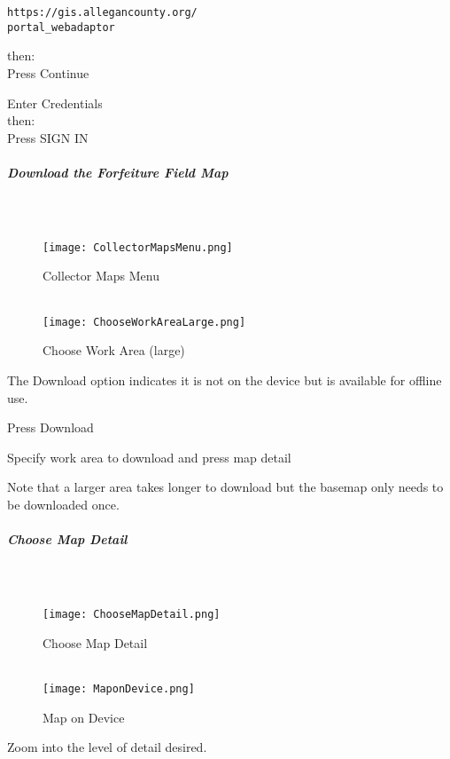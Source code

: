 \documentclass[class=article , crop=false, titlepage, twoside, multi={itemize, figure, verbatim}, float=false]{standalone}
\begin{document}
\begin{verbatim}
https://gis.allegancounty.org/
portal_webadaptor

\end{verbatim}

then:\\

Press \Large Continue

\vspace{3in}
Enter Credentials\\

then:\\

Press \Large SIGN IN
\clearpage
\subparagraph{Download the Forfeiture Field Map}

\subparagraph*{\\}
\begin{wrapfigure}{r}{0.5\textwidth}
\centering
\texttt{[image: CollectorMapsMenu.png]}
\caption{Collector Maps Menu}
\vspace{.25in}
\HRule \\[.4cm] %
\vspace{.25in}
\texttt{[image: ChooseWorkAreaLarge.png]}
\caption{Choose Work Area (large)}
\end{wrapfigure}
The Download option indicates it is not on the device but is available for offline use.
\vspace{.5in}

\noindent Press \Large Download\\
\vspace{3in}

\noindent Specify work area to download and press \Large map detail\\
\vspace{.5in}

\noindent \footnotesize Note that a larger area takes longer to download but the basemap only needs to be downloaded once.
\clearpage
\subparagraph{Choose Map Detail}

\subparagraph*{\\}
\begin{wrapfigure}{r}{0.5\textwidth}
\centering
\texttt{[image: ChooseMapDetail.png]}
\caption{Choose Map Detail}
\vspace{.25in}
\HRule \\[.4cm] %
\vspace{.25in}
\texttt{[image: MaponDevice.png]}
\caption{Map on Device}
\end{wrapfigure}
Zoom into the level of detail desired.
\vspace{.5in}
\end{document}
